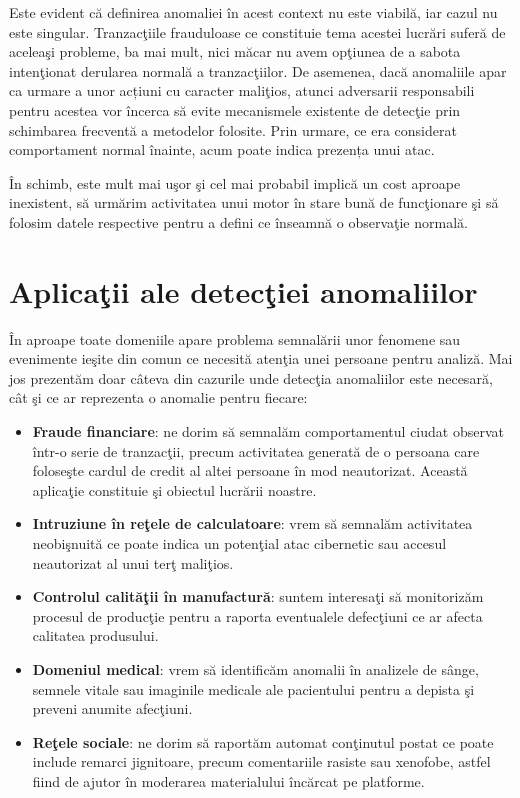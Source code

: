 Este evident că definirea anomaliei în acest context nu este viabilă, iar 
cazul nu este singular. Tranzacţiile frauduloase ce constituie tema acestei lucrări 
suferă de aceleaşi probleme, ba mai mult, nici măcar nu avem opţiunea de a 
sabota intenţionat derularea normală a tranzacţiilor. De asemenea,
dacă anomaliile apar ca urmare a unor acțiuni cu caracter maliţios,
atunci adversarii responsabili pentru acestea vor încerca să 
evite mecanismele existente de detecţie prin schimbarea 
frecventă a metodelor folosite. Prin urmare, ce era considerat
comportament normal înainte, acum poate indica prezența unui 
atac.


În schimb, 
este mult mai uşor şi cel mai probabil 
implică un cost aproape inexistent, să urmărim activitatea unui motor 
în stare bună de funcţionare şi să folosim datele respective pentru a 
defini ce înseamnă o observaţie normală.

\section{Aplicaţii ale detecţiei anomaliilor}

În aproape toate domeniile apare problema semnalării unor fenomene sau evenimente 
ieşite din comun ce necesită atenţia unei persoane pentru analiză. Mai jos prezentăm
doar câteva din cazurile unde detecţia anomaliilor este necesară, cât şi ce ar 
reprezenta o anomalie pentru fiecare:

\begin{itemize}
    \item \textbf{Fraude financiare}: ne dorim să semnalăm comportamentul ciudat 
    observat într-o serie de tranzacţii, precum activitatea generată de 
    o persoana care foloseşte cardul de credit al altei persoane în mod 
    neautorizat. Această aplicaţie constituie şi obiectul lucrării noastre.
    \item \textbf{Intruziune în reţele de calculatoare}: vrem să semnalăm activitatea
    neobişnuită ce poate indica un potenţial atac cibernetic sau accesul 
    neautorizat al unui terţ maliţios.
    \item \textbf{Controlul calităţii în manufactură}: suntem interesaţi să monitorizăm 
    procesul de producţie pentru a raporta eventualele defecţiuni ce ar afecta 
    calitatea produsului.
    \item \textbf{Domeniul medical}: vrem să identificăm anomalii în analizele de sânge, 
    semnele vitale sau imaginile medicale ale pacientului pentru a depista şi preveni
    anumite afecţiuni.
    \item \textbf{Reţele sociale}: ne dorim să raportăm automat conţinutul postat ce 
    poate include remarci jignitoare, precum comentariile rasiste sau xenofobe,
    astfel fiind de ajutor în moderarea materialului încărcat pe platforme. 
\end{itemize}

